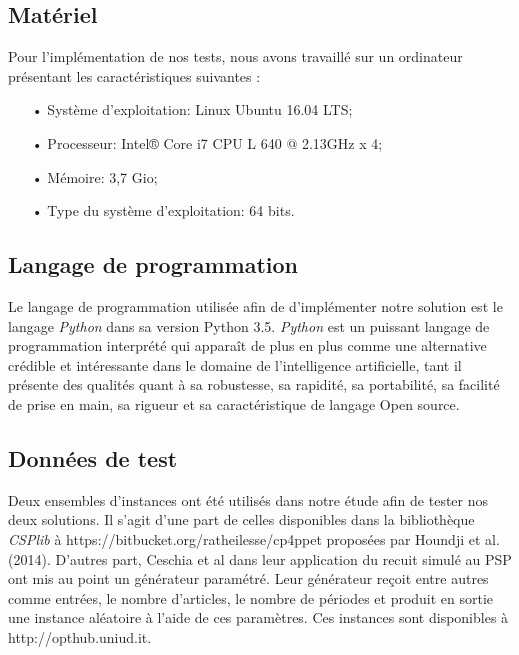 \documentclass[12pt,a4paper]{article}
\begin{document}
		\subsection{Matériel}
		Pour l'implémentation de nos tests, nous avons travaillé sur un ordinateur présentant les caractéristiques suivantes :\\
		\begin{itemize}
			\item[•] Système d'exploitation: Linux Ubuntu 16.04 LTS; \\
			\item[•] Processeur: Intel®  Core  i7 CPU L 640 @ 2.13GHz x 4; \\
			\item[•] Mémoire: 3,7 Gio;\\
			\item[•] Type du système d'exploitation: 64 bits.\\
		\end{itemize}
		\subsection{Langage de programmation}
		Le langage de programmation utilisée afin de d'implémenter notre solution est le langage \emph{Python} dans sa version Python 3.5. \emph{Python} est un puissant langage de programmation interprété qui apparaît de plus en plus comme une alternative crédible et intéressante dans le domaine de l'intelligence artificielle, tant il présente des qualités quant à sa robustesse, sa rapidité, sa portabilité, sa facilité de prise en main, sa rigueur et sa caractéristique de langage Open source.  
		
		\subsection{Données de test}
		
		Deux ensembles d'instances ont été utilisés dans notre étude afin de tester nos deux solutions. Il s'agit d'une part de celles disponibles dans la bibliothèque \emph{CSPlib} à https://bitbucket.org/ratheilesse/cp4ppet proposées par Houndji et al. (2014). D'autres part, Ceschia et al dans leur application du recuit simulé au PSP ont mis au point un générateur paramétré. Leur générateur reçoit entre autres comme entrées, le nombre d'articles, le nombre de périodes et produit en sortie une instance aléatoire à l'aide de ces paramètres. Ces instances sont disponibles à http://opthub.uniud.it.
		
\end{document}
